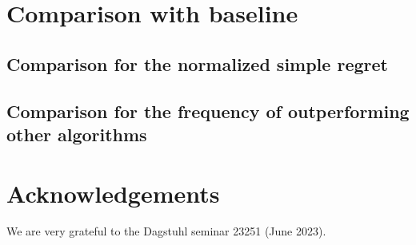 
\section{Comparison with baseline}
\subsection{Comparison for the normalized simple regret}

\subsection{Comparison for the frequency of outperforming other algorithms}


\section*{Acknowledgements}
We are very grateful to the Dagstuhl seminar 23251 (June 2023).%




